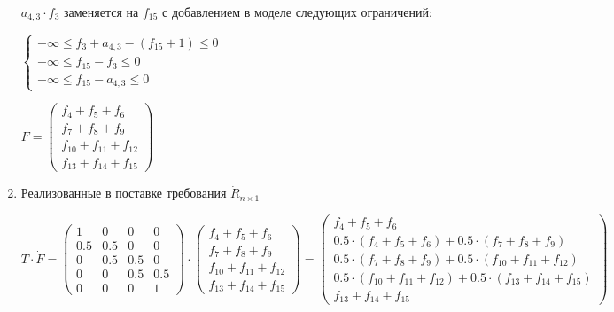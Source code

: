 \begin{enumerate}
  $a_{4, 3} \cdot f_{3}$ заменяется на $f_{15}$ с добавлением в моделе следующих ограничений:
  \begin{center}
    $
      \begin{cases}
        -\infty \le f_{3} + a_{4,3} - (f_{15} + 1) \le 0 \\ %
        -\infty \le f_{15} - f_{3} \le 0 \\ %
        -\infty \le f_{15} - a_{4,3} \le 0 %
      \end{cases}
    $
  \end{center}
  \begin{center}
    $
      \dot{F}
      =
      \begin{pmatrix}
        f_{4} + f_{5} + f_{6} \\ 
        f_{7} + f_{8} + f_{9} \\
        f_{10} + f_{11} + f_{12} \\
        f_{13} + f_{14} + f_{15}
      \end{pmatrix}
    $
  \end{center}

  \item Реализованные в поставке требования $\dot{R}_{n \times 1}$
  \begin{center}
    $
      T \cdot \dot{F}
      =
      \begin{pmatrix}
          1 &   0 &   0 & 0   \\
        0.5 & 0.5 &   0 & 0   \\
          0 & 0.5 & 0.5 & 0   \\
          0 &   0 & 0.5 & 0.5 \\
          0 &   0 &   0 & 1 
      \end{pmatrix}
      \cdot
      \begin{pmatrix}
        f_{4} + f_{5} + f_{6} \\ 
        f_{7} + f_{8} + f_{9} \\
        f_{10} + f_{11} + f_{12} \\
        f_{13} + f_{14} + f_{15}
      \end{pmatrix}
      =
      \begin{pmatrix}
        f_{4} + f_{5} + f_{6} \\
        0.5 \cdot (f_{4} + f_{5} + f_{6}) + 0.5 \cdot (f_{7} + f_{8} + f_{9}) \\
        0.5 \cdot (f_{7} + f_{8} + f_{9}) + 0.5 \cdot (f_{10} + f_{11} + f_{12}) \\
        0.5 \cdot (f_{10} + f_{11} + f_{12}) + 0.5 \cdot (f_{13} + f_{14} + f_{15}) \\
        f_{13} + f_{14} + f_{15}
      \end{pmatrix}
    $
  \end{center}


\end{enumerate}
